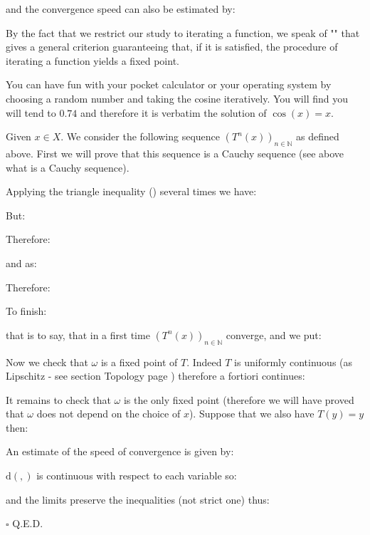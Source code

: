 	and the convergence speed can also be estimated by:
	
	By the fact that we restrict our study to iterating a function, we speak of "\label{banach fixed point theorem}" that gives a general criterion guaranteeing that, if it is satisfied, the procedure of iterating a function yields a fixed point.
	\begin{tcolorbox}[title=Remark,colframe=black,arc=10pt]
	You can have fun with your pocket calculator or your operating system by choosing a random number and taking the cosine iteratively. You will find you will tend to $0.74$ and therefore it is verbatim the solution of $\cos (x) = x$.
	\end{tcolorbox}
	\begin{dem}
	Given $x\in X$. We consider the following sequence $(T^n(x))_{n\in \mathbb{N}}$ as defined above. First we will prove that this sequence is a Cauchy sequence (see above what is a Cauchy sequence).

	Applying the triangle inequality () several times we have:
	
	But:
	
	Therefore:
	
	and as:
	
	Therefore:
	
	To finish:
	
	that is to say, that in a first time $(T^n(x))_{n\in \mathbb{N}}$ converge, and we put:
	
	Now we check that $\omega$ is a fixed point of $T$. Indeed $T$ is uniformly continuous (as Lipschitz - see section Topology page \pageref{lipschitz functions}) therefore a fortiori continues:
	
	It remains to check that $\omega$ is the only fixed point (therefore we will have proved that $\omega$ does not depend on the choice of $x$). Suppose that we also have $T(y)=y$ then:
	
	An estimate of the speed of convergence is given by:
	
	$\mathrm{d}(,)$ is continuous with respect to each variable so:
	
	and the limits preserve the inequalities (not strict one) thus:
	
	\begin{flushright}
		$\square$  Q.E.D.
	\end{flushright}
	\end{dem}
	
